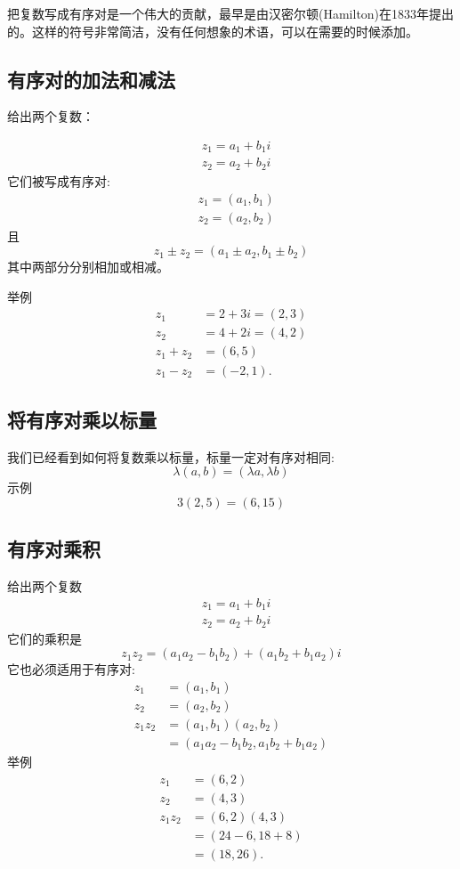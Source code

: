 把复数写成有序对是一个伟大的贡献，最早是由汉密尔顿(Hamilton)在1833年提出的。这样的符号非常简洁，没有任何想象的术语，可以在需要的时候添加。

\subsection{有序对的加法和减法}
给出两个复数：

$$
\begin{aligned}
& z_{1}=a_{1}+b_{1} i \\
& z_{2}=a_{2}+b_{2} i
\end{aligned}
$$
它们被写成有序对:
$$
\begin{aligned}
& z_{1}=\left(a_{1}, b_{1}\right) \\
& z_{2}=\left(a_{2}, b_{2}\right)
\end{aligned}
$$
且
$$
z_{1} \pm z_{2}=\left(a_{1} \pm a_{2}, b_{1} \pm b_{2}\right)
$$
其中两部分分别相加或相减。

举例
$$
\begin{aligned}
z_{1} & =2+3 i=(2,3) \\
z_{2} & =4+2 i=(4,2) \\
z_{1}+z_{2} & =(6,5) \\
z_{1}-z_{2} & =(-2,1) .
\end{aligned}
$$

\subsection{将有序对乘以标量}
我们已经看到如何将复数乘以标量，标量一定对有序对相同:
$$
\lambda(a, b)=(\lambda a, \lambda b)
$$
示例
$$
3(2,5)=(6,15)
$$

\subsection{有序对乘积}
给出两个复数
$$
\begin{aligned}
& z_{1}=a_{1}+b_{1} i \\
& z_{2}=a_{2}+b_{2} i
\end{aligned}
$$
它们的乘积是
$$
z_{1} z_{2}=\left(a_{1} a_{2}-b_{1} b_{2}\right)+\left(a_{1} b_{2}+b_{1} a_{2}\right) i
$$
它也必须适用于有序对:
$$
\begin{aligned}
z_{1} & =\left(a_{1}, b_{1}\right) \\
z_{2} & =\left(a_{2}, b_{2}\right) \\
z_{1} z_{2} & =\left(a_{1}, b_{1}\right)\left(a_{2}, b_{2}\right) \\
& =\left(a_{1} a_{2}-b_{1} b_{2}, a_{1} b_{2}+b_{1} a_{2}\right)
\end{aligned}
$$
举例
$$
\begin{aligned}
z_{1} & =(6,2) \\
z_{2} & =(4,3) \\
z_{1} z_{2} & =(6,2)(4,3) \\
& =(24-6,18+8) \\
& =(18,26) .
\end{aligned}
$$

